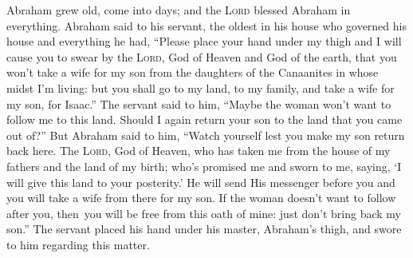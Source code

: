 
\begin{inparaenum}
   Abraham grew old, come into days; and the \textsc{Lord} blessed Abraham in everything.%
   Abraham said to his servant, the oldest in his house who governed his house and everything he had, ``Please place your hand under my thigh%
   and I will cause you to swear by the \textsc{Lord}, God of Heaven and God of the earth, that you won't take a wife for my son from the daughters of the Canaanites in whose midst I'm living:%
   but you shall go to my land, to my family, and take a wife for my son, for Isaac.''%
   The servant said to him, ``Maybe the woman won't want to follow me to this land. Should I again return your son to the land that you came out of?''%
   But Abraham said to him, ``Watch yourself lest you make my son return back here.%
   The \textsc{Lord}, God of Heaven, who has taken me from the house of my fathers and the land of my birth; who's promised me and sworn to me, saying, `I will give this land to your posterity.' He will send His messenger before you and you will take a wife from there for my son.%
   If the woman doesn't want to follow after you, then\understood\ you will be free from this oath of mine: just don't bring back my son.''%
   The servant placed his hand under his master, Abraham's thigh, and swore to him regarding this matter.%
  

\end{inparaenum}

